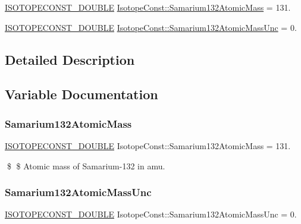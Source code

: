\begin{DoxyCompactItemize}
\item 
\mbox{\hyperlink{group___isotope_const-_macros_ga8f45a7272ce02c0b4c65c44636ed719a}{I\+S\+O\+T\+O\+P\+E\+C\+O\+N\+S\+T\+\_\+\+D\+O\+U\+B\+LE}} \mbox{\hyperlink{group___isotope_const-_samarium-_sm132_ga5a1e91f616e28e2b831a70c969003a5e}{Isotope\+Const\+::\+Samarium132\+Atomic\+Mass}} = 131.
\item 
\mbox{\hyperlink{group___isotope_const-_macros_ga8f45a7272ce02c0b4c65c44636ed719a}{I\+S\+O\+T\+O\+P\+E\+C\+O\+N\+S\+T\+\_\+\+D\+O\+U\+B\+LE}} \mbox{\hyperlink{group___isotope_const-_samarium-_sm132_ga2ec563900ef1bca0877a9c80b610a563}{Isotope\+Const\+::\+Samarium132\+Atomic\+Mass\+Unc}} = 0.
\end{DoxyCompactItemize}


\subsection{Detailed Description}


\subsection{Variable Documentation}
\mbox{\label{group___isotope_const-_samarium-_sm132_ga5a1e91f616e28e2b831a70c969003a5e}} 
\subsubsection{\texorpdfstring{Samarium132\+Atomic\+Mass}{Samarium132AtomicMass}}
{\footnotesize\ttfamily \mbox{\hyperlink{group___isotope_const-_macros_ga8f45a7272ce02c0b4c65c44636ed719a}{I\+S\+O\+T\+O\+P\+E\+C\+O\+N\+S\+T\+\_\+\+D\+O\+U\+B\+LE}} Isotope\+Const\+::\+Samarium132\+Atomic\+Mass = 131.}

\$ \$ Atomic mass of Samarium-\/132 in amu. \mbox{\label{group___isotope_const-_samarium-_sm132_ga2ec563900ef1bca0877a9c80b610a563}} 
\subsubsection{\texorpdfstring{Samarium132\+Atomic\+Mass\+Unc}{Samarium132AtomicMassUnc}}
{\footnotesize\ttfamily \mbox{\hyperlink{group___isotope_const-_macros_ga8f45a7272ce02c0b4c65c44636ed719a}{I\+S\+O\+T\+O\+P\+E\+C\+O\+N\+S\+T\+\_\+\+D\+O\+U\+B\+LE}} Isotope\+Const\+::\+Samarium132\+Atomic\+Mass\+Unc = 0.}

